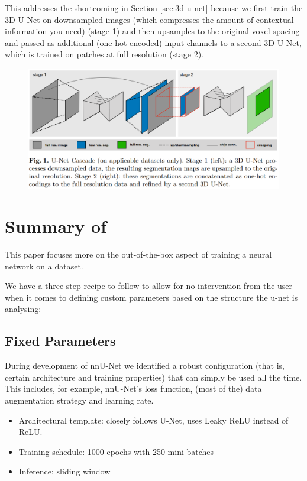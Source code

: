 \documentclass[11pt]{article}
\begin{document}
This addresses the shortcoming in Section \ref{sec:3d-u-net} because we first train the 3D U-Net on downsampled images (which compresses the amount of contextual information you need) (stage 1) and then upsamples to the original voxel spacing and passed as additional (one hot encoded) input channels to a second 3D U-Net, which is trained on patches at full resolution (stage 2).

\begin{figure}[H]
    \includegraphics[width=\linewidth]{images/nnunet-diagram.png}
\end{figure}

\section{Summary of \cite{nnunet-git-paper}}

This paper focuses more on the out-of-the-box aspect of training a neural network on a dataset.

We have a three step recipe to follow to allow for no intervention from the user when it comes to defining custom parameters based on the structure the u-net is analysing:

\subsection{Fixed Parameters}

During development of nnU-Net we identified a robust configuration (that is, certain architecture and training properties) that can simply be used all the time. This includes, for example, nnU-Net's loss function, (most of the) data augmentation strategy and learning rate.

\begin{itemize}
    \item Architectural template: closely follows U-Net, uses Leaky ReLU instead of ReLU.
    \item Training schedule: 1000 epochs with 250 mini-batches
    \item Inference: sliding window
\end{itemize}
\end{document}
